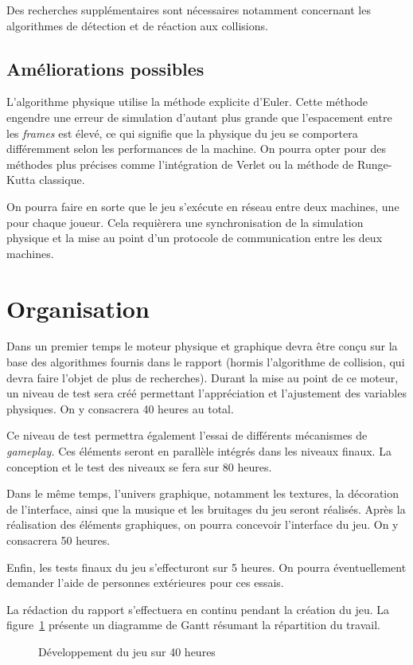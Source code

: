 Des recherches supplémentaires sont nécessaires notamment
concernant les algorithmes de détection et de réaction
aux collisions. \cite{ptf-collision-detection, ptf-collision-response}

\subsection{Améliorations possibles}

L'algorithme physique utilise la méthode explicite d'Euler.
Cette méthode engendre une erreur de simulation d'autant
plus grande que l'espacement entre les \emph{frames} est
élevé, ce qui signifie que la physique du jeu se comportera
différemment selon les performances de la machine. On pourra
opter pour des méthodes plus précises comme l'intégration
de Verlet \cite{ptf-verlet} ou la méthode de Runge-Kutta classique.
\cite{ptf-rk4}

On pourra faire en sorte que le jeu s'exécute en réseau
entre deux machines, une pour chaque joueur. Cela requièrera
une synchronisation de la simulation physique et la mise au point d'un
protocole de communication entre les deux machines.

\section{Organisation}

Dans un premier temps le moteur physique et graphique devra
être conçu sur la base des algorithmes fournis dans le rapport
(hormis l'algorithme de collision, qui devra faire l'objet
de plus de recherches). Durant la mise au point de ce moteur,
un niveau de test sera créé permettant l'appréciation
et l'ajustement des variables physiques. On y consacrera 40 heures
au total.

Ce niveau de test permettra également l'essai de différents
mécanismes de \emph{gameplay.} Ces éléments seront en parallèle
intégrés dans les niveaux finaux. La conception et le
test des niveaux se fera sur 80 heures.

Dans le même temps, l'univers graphique, notamment les textures,
la décoration de l'interface, ainsi que la musique et les bruitages
du jeu seront réalisés. Après la réalisation des éléments
graphiques, on pourra concevoir l'interface du jeu.
On y consacrera 50 heures.

Enfin, les tests finaux du jeu s'effecturont sur 5 heures.
On pourra éventuellement demander l'aide de personnes extérieures
pour ces essais.

La rédaction du rapport s'effectuera en continu pendant la création du jeu.
La figure~\ref{fig:ptf-gantt} présente un diagramme de Gantt résumant
la répartition du travail.

\begin{figure}[h!]
    \centering
    
    \caption{Développement du jeu sur 40 heures}
    \label{fig:ptf-gantt}
\end{figure}
